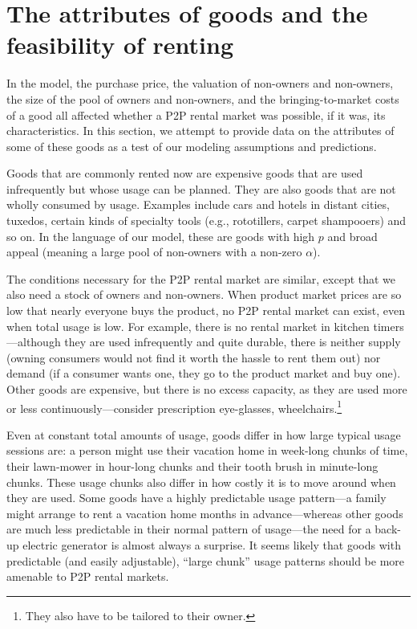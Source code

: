\documentclass[11pt]{article}
\begin{document}
\section{The attributes of goods and the feasibility of renting}

In the model, the purchase price, the valuation of non-owners and non-owners, the size of the pool of owners and non-owners, and the bringing-to-market costs of a good all affected whether a P2P rental market was possible, if it was, its characteristics.
In this section, we attempt to provide data on the attributes of some of these goods as a test of our modeling assumptions and predictions.  


Goods that are commonly rented now are expensive goods that are used infrequently but whose usage can be planned.
They are also goods that are not wholly consumed by usage. 
Examples include cars and hotels in distant cities, tuxedos, certain kinds of specialty tools (e.g., rototillers, carpet shampooers) and so on.
In the language of our model, these are goods with high $p$ and broad appeal (meaning a large pool of non-owners with a non-zero $\alpha$).

The conditions necessary for the P2P rental market are similar, except that we also need a stock of owners and non-owners. 
When product market prices are so low that nearly everyone buys the product, no P2P rental market can exist, even when total usage is low.  
For example, there is no rental market in kitchen timers---although they are used infrequently and quite durable, there is neither supply (owning consumers would not find it worth the hassle to rent them out) nor demand (if a consumer wants one, they go to the product market and buy one). 
Other goods are expensive, but there is no excess capacity, as they are used more or less continuously---consider prescription eye-glasses, wheelchairs.\footnote{
   They also have to be tailored to their owner. 
}

Even at constant total amounts of usage, goods differ in how large typical usage sessions are: 
a person might use their vacation home in week-long chunks of time, their lawn-mower in hour-long chunks and their tooth brush in minute-long chunks. 
These usage chunks also differ in how costly it is to move around when they are used. 
Some goods have a highly predictable usage pattern---a family might arrange to rent a vacation home months in advance---whereas other goods are much less predictable in their normal pattern of usage---the need for a back-up electric generator is almost always a surprise.  
It seems likely that goods with predictable (and easily adjustable), ``large chunk'' usage patterns should be more amenable to P2P rental markets. 
\end{document}
